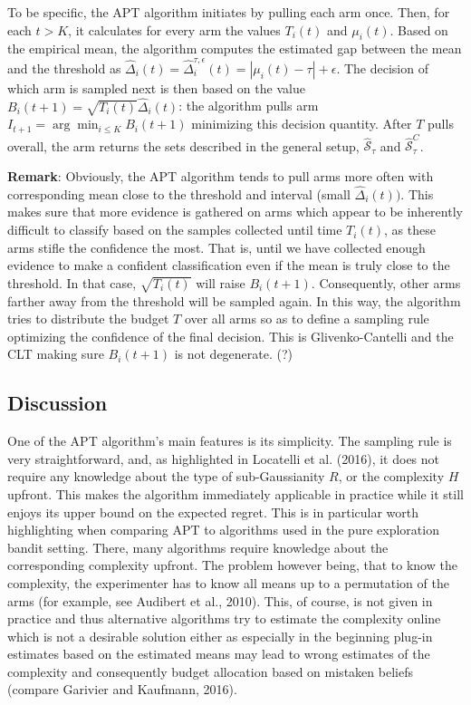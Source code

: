\documentclass[12pt,]{article}
\begin{document}
To be specific, the APT algorithm initiates by pulling each arm once.
Then, for each \(t > K\), it calculates for every arm the values
\(T_i(t)\) and \(\mu_i(t)\). Based on the empirical mean, the algorithm
computes the estimated gap between the mean and the threshold as
\(\hat{\Delta}_i(t) = \hat{\Delta}_i^{\tau, \epsilon}(t) = |\mu_i(t) - \tau| + \epsilon\).
The decision of which arm is sampled next is then based on the value
\(B_i(t+1) = \sqrt{T_i(t)} \hat{\Delta}_i(t)\): the algorithm pulls arm
\(I_{t+1} = \arg \min_{i\leq K} B_i(t+1)\) minimizing this decision
quantity. After \(T\) pulls overall, the arm returns the sets described
in the general setup, \(\hat{\mathcal{S}}_{\tau}\) and
\(\hat{\mathcal{S}}^C_{\tau}\).

\textbf{Remark}: Obviously, the APT algorithm tends to pull arms more
often with corresponding mean close to the threshold and interval (small
\(\hat{\Delta}_i(t))\). This makes sure that more evidence is gathered
on arms which appear to be inherently difficult to classify based on the
samples collected until time \(T_i(t)\), as these arms stifle the
confidence the most. That is, until we have collected enough evidence to
make a confident classification even if the mean is truly close to the
threshold. In that case, \(\sqrt{T_i(t)}\) will raise \(B_i(t+1)\).
Consequently, other arms farther away from the threshold will be sampled
again. In this way, the algorithm tries to distribute the budget \(T\)
over all arms so as to define a sampling rule optimizing the confidence
of the final decision. This is Glivenko-Cantelli and the CLT making sure
\(B_i(t+1)\) is not degenerate. (?)

\subsection{Discussion}\label{discussion}

One of the APT algorithm's main features is its simplicity. The sampling
rule is very straightforward, and, as highlighted in Locatelli et al.
(2016), it does not require any knowledge about the type of
sub-Gaussianity \(R\), or the complexity \(H\) upfront. This makes the
algorithm immediately applicable in practice while it still enjoys its
upper bound on the expected regret. This is in particular worth
highlighting when comparing APT to algorithms used in the pure
exploration bandit setting. There, many algorithms require knowledge
about the corresponding complexity upfront. The problem however being,
that to know the complexity, the experimenter has to know all means up
to a permutation of the arms (for example, see Audibert et al., 2010).
This, of course, is not given in practice and thus alternative
algorithms try to estimate the complexity online which is not a
desirable solution either as especially in the beginning plug-in
estimates based on the estimated means may lead to wrong estimates of
the complexity and consequently budget allocation based on mistaken
beliefs (compare Garivier and Kaufmann, 2016).
\end{document}
